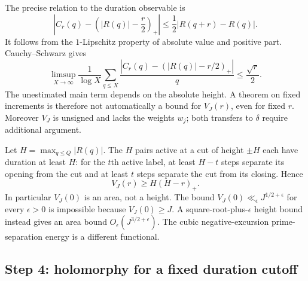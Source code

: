The precise relation to the duration observable is
\begin{equation}
\label{eq:a12-local-error}
\left|C_r(q)-\left(|R(q)|-\frac r2\right)_+\right|
\le\frac12|R(q+r)-R(q)|.
\end{equation}
It follows from the $1$-Lipschitz property of absolute value and positive part.
Cauchy--Schwarz gives
\begin{equation}
\label{eq:a12-local-average}
\limsup_{X\to\infty}\frac1{\log X}
\sum_{q\le X}\frac{|C_r(q)-(|R(q)|-r/2)_+|}{q}
\le\frac{\sqrt r}{2}.
\end{equation}
The unestimated main term depends on the absolute height. A theorem on
fixed increments is therefore not automatically a bound for $V_J(r)$,
even for fixed $r$. Moreover $V_J$ is unsigned and lacks the weights $w_j$;
both transfers to $\delta$ require additional argument.

\begin{remark}
\label{rem:a12-scales}
Let $H=\max_{q\le Q}|R(q)|$. The $H$ pairs active at a cut of height
$\pm H$ each have duration at least $H$: for the $t$th active label,
at least $H-t$ steps separate its opening from the cut and at least $t$
steps separate the cut from its closing. Hence
\begin{equation}
\label{eq:a12-V-height}
V_J(r)\ge H(H-r)_+.
\end{equation}
In particular $V_J(0)$ is an area, not a height.
The bound $V_J(0)\ll_\epsilon J^{1/2+\epsilon}$ for every $\epsilon>0$
is impossible because $V_J(0)\ge J$.
A square-root-plus-$\epsilon$ height bound instead gives an area bound
$O_\epsilon(J^{3/2+\epsilon})$.
The cubic negative-excursion prime-separation energy is a different functional.
\end{remark}

\subsection{Step 4: holomorphy for a fixed duration cutoff}
\label{subsec:a12-short-pairs}

